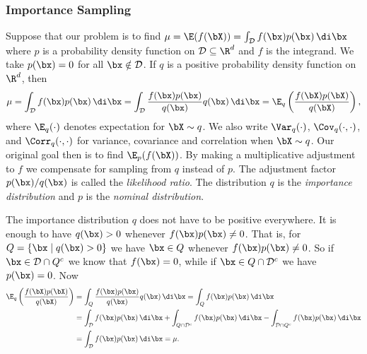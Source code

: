 \subsubsection{Importance Sampling}
Suppose that our problem is to find \(\mu = \E(f(\bX)) = \int_{\mathcal{D}} f(\bx)p(\bx) \, \di \bx\) where \(p\) is a probability density function on \(\mathcal{D} \subseteq \R^d\) and \(f\) is the integrand. We take \(p(\bx) = 0\) for all \(\bx \notin \mathcal{D}\). If \(q\) is a positive probability density function on \(\R^d\), then
\begin{equation}
	\mu = \int_{\mathcal{D}} f(\bx)p(\bx) \, \di \bx = \int_{\mathcal{D}} \frac{f(\bx)p(\bx)}{q(\bx)} q(\bx) \, \di \bx = \E_q \left( \frac{f(\bX)p(\bX)}{q(\bX)} \right),
	\label{eq:ImportanceSamplingIdentity}
\end{equation}
where \(\E_q(\cdot)\) denotes expectation for \(\bX \sim q\). We also write \(\Var_q(\cdot)\), \(\Cov_q(\cdot, \cdot)\), and \(\Corr_q(\cdot, \cdot)\) for variance, covariance and correlation when \(\bX \sim q\). Our original goal then is to find \(\E_p(f(\bX))\). By making a multiplicative adjustment to \(f\) we compensate for sampling from \(q\) instead of \(p\). The adjustment factor \(p(\bx)/q(\bx)\) is called the \textit{likelihood ratio}. The distribution \(q\) is the \textit{importance distribution} and \(p\) is the \textit{nominal distribution}.

The importance distribution \(q\) does not have to be positive everywhere. It is enough to have \(q(\bx) > 0\) whenever \(f(\bx)p(\bx) \neq 0\). That is, for \(Q = \{ \bx \mid q(\bx) > 0 \}\) we have \(\bx \in Q\) whenever \(f(\bx)p(\bx) \neq 0\). So if \(\bx \in \mathcal{D} \cap Q^c\) we know that \(f(\bx) = 0\), while if \(\bx \in Q \cap \mathcal{D}^c\) we have \(p(\bx) = 0\). Now
\begin{align}
	\E_q \left( \frac{f(\bX)p(\bX)}{q(\bX)} \right) & = \int_Q \frac{f(\bx)p(\bx)}{q(\bx)} q(\bx) \, \di \bx = \int_Q f(\bx)p(\bx) \, \di \bx \nonumber                                                                  \\
	                                                & = \int_{\mathcal{D}} f(\bx)p(\bx) \, \di \bx + \int_{Q \cap \mathcal{D}^c} f(\bx)p(\bx) \, \di \bx - \int_{\mathcal{D} \cap Q^c} f(\bx)p(\bx) \, \di \bx \nonumber \\
	                                                & = \int_{\mathcal{D}} f(\bx)p(\bx) \, \di \bx = \mu.
	\label{eq:ImportanceSamplingDerivation}
\end{align}

